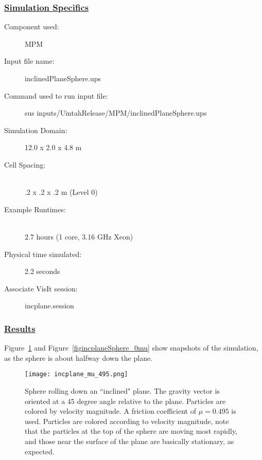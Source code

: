 \subsubsection*{\underline{Simulation Specifics}}
\begin{description} 
\item [Component used:] \hfill MPM
\item [Input file name:] \hfill inclinedPlaneSphere.ups
\item [Command used to run input file:]\hfill \newline sus inputs/UintahRelease/MPM/inclinedPlaneSphere.ups
\item [Simulation Domain:]\hfill    12.0 x 2.0 x 4.8 m

\item [Cell Spacing:]\hfill \\ 
.2 x .2 x .2 m (Level 0)

\item [Example Runtimes:] \hfill \\
 2.7 hours  (1 core, 3.16 GHz Xeon)\\

\item [Physical time simulated:] \hfill 2.2 seconds

\item [Associate VisIt session:] \hfill incplane.session

\end{description}

\subsubsection*{\underline{Results}}
Figure~\ref{figincplaneSphere_bigmu} and Figure~\ref{figincplaneSphere_0mu}
show snapshots of the simulation, as
the sphere is about halfway down the plane.
\begin{figure}
  \center
  \vspace{-35pt}
  \texttt{[image: incplane\_mu\_495.png]}
  \caption{Sphere rolling down an ``inclined" plane.  The gravity vector
is oriented at a 45 degree angle relative to the plane.  Particles are colored
by velocity magnitude. A friction coefficient of $\mu = 0.495$ is used.
Particles are colored according
to velocity magnitude, note that the particles at the top of the sphere
are moving most rapidly, and those near the surface of the plane are 
basically stationary, as expected.}
  \label{figincplaneSphere_bigmu}
\end{figure}

